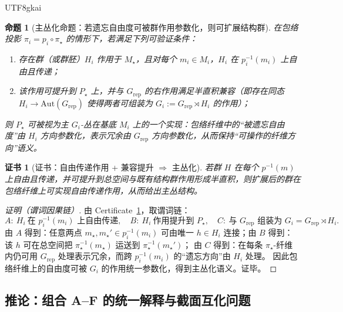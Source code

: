 \documentclass[12pt]{article}
\newtheorem{proposition}{命题}[section]
\newtheorem{certificate}{证书}[section]
\begin{document}
\begin{CJK*}{UTF8}{gkai}
\begin{proposition}[主丛化命题：若遗忘自由度可被群作用参数化，则可扩展结构群]
\label{prop:principalization}
在包络投影 $\pi_i=p_i\circ\pi_\star$ 的情形下，若满足下列可验证条件：
\begin{enumerate}
  \item 存在群（或群胚）$H_i$ 作用于 $M_\star$，且对每个 $m_i\in M_i$，$H_i$ 在 $p_i^{-1}(m_i)$ 上自由且传递；
  \item 该作用可提升到 $P_\star$ 上，并与 $G_{\mathrm{rep}}$ 的右作用满足半直积兼容（即存在同态 $H_i\to \mathrm{Aut}(G_{\mathrm{rep}})$ 使得两者可组装为
    $G_i:=G_{\mathrm{rep}}\rtimes H_i$ 的作用）；
\end{enumerate}
则 $P_\star$ 可被视为主 $G_i$-丛在基底 $M_i$ 上的一个实现：包络纤维中的“被遗忘自由度”由 $H_i$ 方向参数化，表示冗余由 $G_{\mathrm{rep}}$ 方向参数化，从而保持“可操作的纤维方向”语义。
\end{proposition}

\begin{certificate}[证书：自由传递作用 + 兼容提升 $\Rightarrow$ 主丛化]
\label{cert:principalization}
若群 $H$ 在每个 $p^{-1}(m)$ 上自由且传递，并可提升到总空间与既有结构群作用形成半直积，则扩展后的群在包络纤维上可实现自由传递作用，从而给出主丛结构。
\end{certificate}

\begin{proof}[证明（谓词因果链）]
由 Certificate~\ref{cert:principalization}，取谓词链：
\[
A:\ H_i\ \text{在 }p_i^{-1}(m_i)\text{ 上自由传递},\quad
B:\ H_i\ \text{作用提升到 }P_\star,\quad
C:\ \text{与 }G_{\mathrm{rep}}\text{ 组装为 }G_i=G_{\mathrm{rep}}\rtimes H_i.
\]
由 $A$ 得到：任意两点 $m_\star,m_\star'\in p_i^{-1}(m_i)$ 可由唯一 $h\in H_i$ 连接；由 $B$ 得到：该 $h$ 可在总空间把 $\pi_\star^{-1}(m_\star)$ 运送到
  $\pi_\star^{-1}(m_\star')$；
由 $C$ 得到：在每条 $\pi_\star$-纤维内仍可用 $G_{\mathrm{rep}}$ 处理表示冗余，而跨 $p_i^{-1}(m_i)$ 的“遗忘方向”由 $H_i$ 处理。
因此包络纤维上的自由度可被 $G_i$ 的作用统一参数化，得到主丛化语义。证毕。
\end{proof}

\subsection{推论：组合 A--F 的统一解释与截面互化问题}


\end{CJK*}
\end{document}
